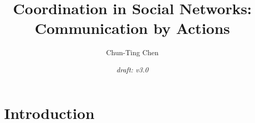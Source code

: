 \documentclass[12pt,letter]{article}
\theoremstyle{definition}
\theoremstyle{remark}
\theoremstyle{claim}
\begin{document}

\title {Coordination in Social Networks: Communication by Actions}
\author {Chun-Ting Chen}
\date{\textit{draft: v3.0}}
\maketitle

\begin{abstract}





\end{abstract}


\section{Introduction} 
\end{document}
